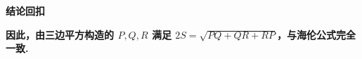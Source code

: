 \begin{proofbox}
\medskip
\textbf{\textcolor{CProof}{结论回扣}}

\textbf{因此，由三边平方构造的 $P,Q,R$ 满足 $2S = \sqrt{PQ+QR+RP}$，与海伦公式完全一致.}

\end{proofbox}

